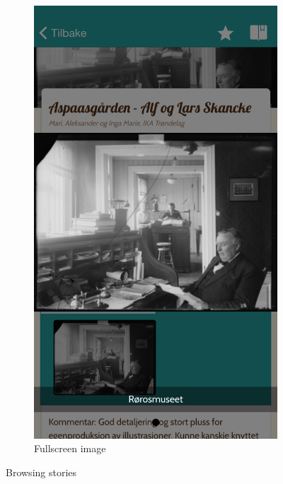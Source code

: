 \begin{appendices}
\begin{figure}[h!]
\begin{subfigure}[h]{0.32\textwidth}
			\includegraphics[width=\textwidth]{fig/screenshot_image}
			\caption{Fullscreen image}
		\end{subfigure}
		\caption{Browsing stories}
		\label{fig:manual_browsing}
\end{figure}
\clearpage

\end{appendices}
